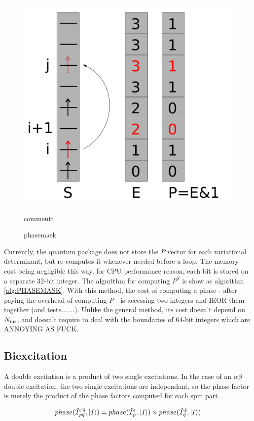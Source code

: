 \documentclass[./thesis.tex]{subfiles}
\begin{document}
                
\begin{figure}[h!]
	\begin{center}
		\includegraphics[width=0.6\columnwidth]{figures/determinant_driven/phase}
		\caption{
		\label{generators_selectors}%
		phasemask
		}
		commentt
	\end{center}
\end{figure}
        
Currently, the quantum package does not store the $P$ vector for each variational determinant, but re-computes it whenever needed before a loop. The memory cost being negligible this way, for CPU performance reason, each bit is stored on a separate 32-bit integer.
The algorithm for computing $P^S$ is show as algorithm \ref{alg:PHASEMASK}. 
With this method, the cost of computing a phase - after paying the overhead of computing $P$ - is accessing two integers and IEOR them together (and tests.......). Unlike the general method, its cost doesn't depend on ${N_\text{int}}$, and doesn't require to deal with the boundaries of 64-bit integers which are ANNOYING AS FUCK.
        

\subsection{Biexcitation}







A double excitation is a product of two single excitations.
In the case of an $\alpha \beta$ double excitation, the two single excitations are independant, so the phase factor is merely the product of the phase factors computed for each spin part. 


$$phase(\hat T_{p \bar q}^{r \bar s}, \ket I) = phase(\hat T_{p}^{r}, \ket I) \times phase(\hat T_{ \bar q}^{ \bar s}, \ket I) $$
\end{document}
